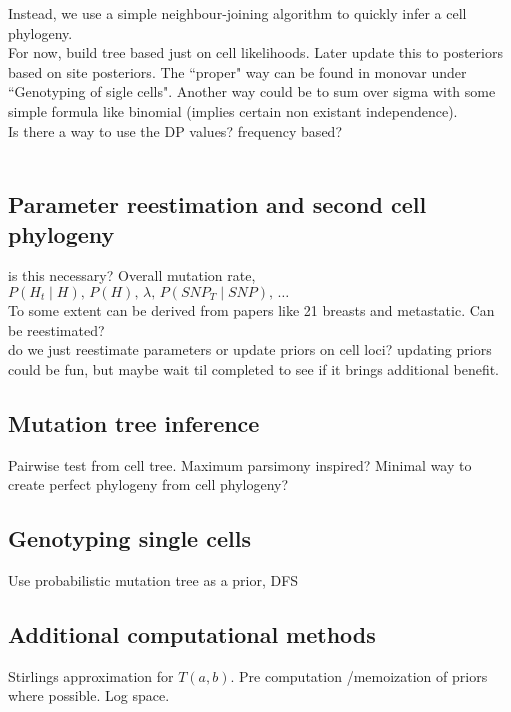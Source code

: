 \documentclass[../main.tex]{subfiles}
\begin{document}
Instead, we use a simple neighbour-joining algorithm to quickly infer a cell phylogeny.\\

For now, build tree based just on cell likelihoods. Later update this to posteriors based on site posteriors. The ``proper" way can be found in monovar under ``Genotyping of sigle cells". Another way could be to sum over sigma with some simple formula like binomial (implies certain non existant independence).\\

Is there a way to use the DP values? frequency based?\\\\

\subsection{Parameter reestimation and second cell phylogeny}
is this necessary? Overall mutation rate, $P(H_t\mid H),\,P(H),\,\lambda,\,P(SNP_T\mid SNP),\,\dots$\\
To some extent can be derived from papers like 21 breasts and metastatic. Can be reestimated?\\
do we just reestimate parameters or update priors on cell loci? updating priors could be fun, but maybe wait til completed to see if it brings additional benefit.\\

\subsection{Mutation tree inference}
Pairwise test from cell tree. Maximum parsimony inspired? Minimal way to create perfect phylogeny from cell phylogeny?
\subsection{Genotyping single cells}
Use probabilistic mutation tree as a prior, DFS
\subsection{Additional computational methods}
Stirlings approximation for $T(a,b)$. Pre computation /memoization of priors where possible. Log space.
\end{document}

